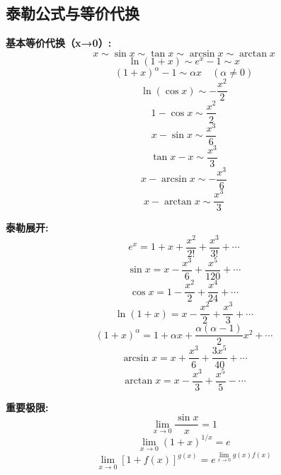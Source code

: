 \documentclass[10pt]{article}
\begin{document}
\begin{multicols*}{3}
\section*{泰勒公式与等价代换}
\vspace{-8pt}

\textbf{基本等价代换（x→0）:}
\[x \sim \sin x \sim \tan x \sim \arcsin x \sim \arctan x\]
\[\ln(1+x) \sim e^x - 1 \sim x\]
\[(1+x)^\alpha - 1 \sim \alpha x \quad (\alpha \neq 0)\]
\[\ln(\cos x) \sim -\frac{x^2}{2}\]
\[1 - \cos x \sim \frac{x^2}{2}\]
\[x - \sin x \sim \frac{x^3}{6}\]
\[\tan x - x \sim \frac{x^3}{3}\]
\[x - \arcsin x \sim -\frac{x^3}{6}\]
\[x - \arctan x \sim \frac{x^3}{3}\]

\textbf{泰勒展开:}
\[e^x = 1 + x + \frac{x^2}{2!} + \frac{x^3}{3!} + \cdots\]
\[\sin x = x - \frac{x^3}{6} + \frac{x^5}{120} + \cdots\]
\[\cos x = 1 - \frac{x^2}{2} + \frac{x^4}{24} + \cdots\]
\[\ln(1+x) = x - \frac{x^2}{2} + \frac{x^3}{3} + \cdots\]
\[(1+x)^\alpha = 1 + \alpha x + \frac{\alpha(\alpha-1)}{2}x^2 + \cdots\]
\[\arcsin x = x + \frac{x^3}{6} + \frac{3x^5}{40} + \cdots\]
\[\arctan x = x - \frac{x^3}{3} + \frac{x^5}{5} - \cdots\]


\textbf{重要极限:}
\[\lim_{x \to 0} \frac{\sin x}{x} = 1\]
\[\lim_{x \to 0} (1+x)^{1/x} = e\]
\[\lim_{x \to 0} [1 + f(x)]^{g(x)} = e^{\lim_{x \to 0} g(x)f(x)}\]

\end{multicols*}
\end{document}

